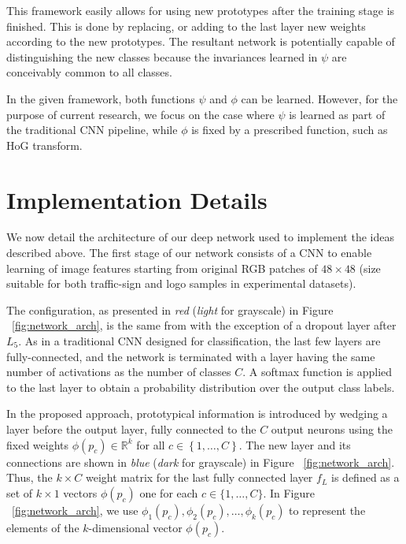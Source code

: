 \documentclass{bmvc2k}
\begin{document}
This framework easily allows for using new prototypes after
the training stage is finished. This is done by replacing, or adding to the last
layer new weights according to the new prototypes. The resultant network is
potentially capable of distinguishing the new classes because the invariances
learned in $\psi$ are conceivably common to all classes.


In the given framework, both functions $\psi$ and $\phi$ can be learned.
However, for the purpose of current research, we focus on the
case where $\psi$ is learned as part of the traditional CNN pipeline, while $\phi$ is fixed by 
a prescribed function, such as HoG transform.


\section{\label{sec:Implementation-Details}Implementation Details}
We now detail the architecture of our deep network used to implement the ideas described above. 
The first stage of our network consists of a CNN to enable learning of image features starting from 
original RGB patches of $48\times48$ (size suitable for both traffic-sign and
logo samples in experimental datasets). 

The configuration, as presented in \textit{red} (\textit{light} for grayscale)
in Figure ~\ref{fig:network_arch}, is the same from {\cite{multicolumnarDNN}}
with the exception of a dropout layer after $L_{5}$.
As in a traditional CNN designed for classification, the last few layers are fully-connected, and the 
network is terminated with a layer having the same number of activations as the number of classes $C$. 
A softmax function is applied to the last layer to obtain a probability distribution over the output class 
labels. 

In the proposed approach, prototypical information is introduced by wedging a layer before the output 
layer, fully connected to the $C$ output neurons using the fixed weights $\phi(p_c)\in \mathbb{R}^k$ for 
all $c\in\left\{ 1,\ldots,C\right\}$. The new layer and its connections are
shown in \textit{blue} (\textit{dark} for grayscale) in
Figure ~\ref{fig:network_arch}.
Thus, the $k\times C$ weight matrix for the last fully connected layer $f_{L}$
is defined as a set of $k\times1$ vectors $\phi(p_c)$ one for each
$c\in\{{1,\ldots, C}\}$. In Figure ~\ref{fig:network_arch}, we use $\phi_1(p_c),
\phi_2(p_c), \ldots,  \phi_k(p_c)$ to represent the elements of the $k$-dimensional vector $\phi(p_c)$.
\end{document}
